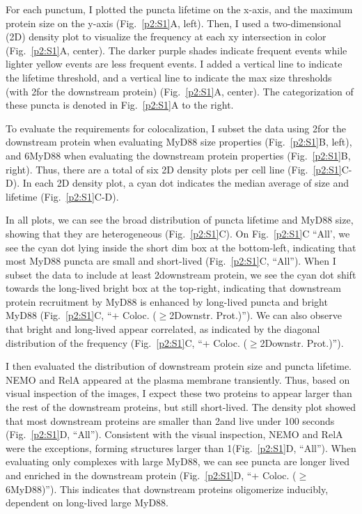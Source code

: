 For each punctum, I plotted the puncta lifetime on the x-axis, and the maximum protein size on the y-axis (Fig.~\ref{p2:S1}A, left). Then, I used a two-dimensional (2D) density plot to visualize the frequency at each xy intersection in color (Fig.~\ref{p2:S1}A, center). The darker purple shades indicate frequent events while lighter yellow events are less frequent events. I added a vertical line to indicate the lifetime threshold, and a vertical line to indicate the max size thresholds (with 2\times for the downstream protein) (Fig.~\ref{p2:S1}A, center). The categorization of these puncta is denoted in Fig.~\ref{p2:S1}A to the right.

To evaluate the requirements for colocalization, I subset the data using 2\times for the downstream protein when evaluating MyD88 size properties (Fig.~\ref{p2:S1}B, left), and 6\times MyD88 when evaluating the downstream protein properties (Fig.~\ref{p2:S1}B, right). Thus, there are a total of six 2D density plots per cell line (Fig.~\ref{p2:S1}C-D). In each 2D density plot, a cyan dot indicates the median average of size and lifetime (Fig.~\ref{p2:S1}C-D).

In all plots, we can see the broad distribution of puncta lifetime and MyD88 size, showing that they are heterogeneous (Fig.~\ref{p2:S1}C). On Fig.~\ref{p2:S1}C “All’, we see the cyan dot lying inside the short dim box at the bottom-left, indicating that most MyD88 puncta are small and short-lived (Fig.~\ref{p2:S1}C, “All”). When I subset the data to include at least 2\times downstream protein, we see the cyan dot shift towards the long-lived bright box at the top-right, indicating that downstream protein recruitment by MyD88 is enhanced by long-lived puncta and bright MyD88 (Fig.~\ref{p2:S1}C, “+ Coloc. ($\geq$2\times Downstr. Prot.)”). We can also observe that bright and long-lived appear correlated, as indicated by the diagonal distribution of the frequency (Fig.~\ref{p2:S1}C, “+ Coloc. ($\geq$2\times Downstr. Prot.)”).

I then evaluated the distribution of downstream protein size and puncta lifetime. NEMO and RelA appeared at the plasma membrane transiently. Thus, based on visual inspection of the images, I expect these two proteins to appear larger than the rest of the downstream proteins, but still short-lived. The density plot showed that most downstream proteins are smaller than 2\times and live under 100 seconds (Fig.~\ref{p2:S1}D, “All”). Consistent with the visual inspection, NEMO and RelA were the exceptions, forming structures larger than 1\times (Fig.~\ref{p2:S1}D, “All”). When evaluating only complexes with large MyD88, we can see puncta are longer lived and enriched in the downstream protein (Fig.~\ref{p2:S1}D, “+ Coloc. ($\geq$6\times MyD88)”). This indicates that downstream proteins oligomerize inducibly, dependent on long-lived large MyD88.



